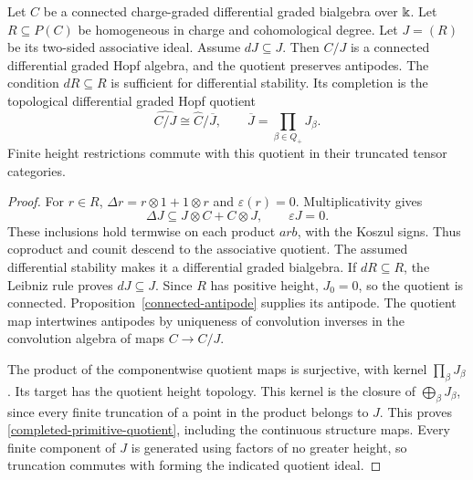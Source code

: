 \begin{theorem}
\label{primitive-quotient}
Let $C$ be a connected charge-graded differential graded bialgebra over
$\Bbbk$.  Let $R\subseteq P(C)$ be homogeneous in charge and cohomological
degree.  Let $J=(R)$ be its two-sided associative ideal.
Assume $dJ\subseteq J$.  Then $C/J$ is a connected differential graded
Hopf algebra, and the quotient preserves antipodes.
The condition $dR\subseteq R$ is sufficient for differential stability.
Its completion is the topological differential graded Hopf quotient
\begin{equation}
 \widehat{C/J}\cong\widehat C/\overline J,
 \qquad \overline J=\prod_{\beta\in Q_+}J_\beta.
 \label{completed-primitive-quotient}
\end{equation}
Finite height restrictions commute with this quotient in their
truncated tensor categories.
\end{theorem}

\begin{proof}
For $r\in R$, $\Delta r=r\otimes1+1\otimes r$ and
$\varepsilon(r)=0$.  Multiplicativity gives
\[
 \Delta J\subseteq J\otimes C+C\otimes J,
 \qquad \varepsilon J=0.
\]
These inclusions hold termwise on each product $arb$, with the Koszul
signs.  Thus coproduct and counit descend to the associative quotient.
The assumed differential stability makes it a differential graded
bialgebra.  If $dR\subseteq R$, the Leibniz rule proves $dJ\subseteq J$.
Since $R$ has positive height, $J_0=0$, so the quotient is connected.
Proposition~\ref{connected-antipode} supplies its antipode.
The quotient map intertwines antipodes by uniqueness of convolution
inverses in the convolution algebra of maps $C\to C/J$.

The product of the componentwise quotient maps is surjective, with
kernel $\prod_\beta J_\beta$.  Its target has the quotient height
topology.  This kernel is the closure of $\bigoplus_\beta J_\beta$,
since every finite truncation of a point in the product belongs to $J$.
This proves \eqref{completed-primitive-quotient}, including the
continuous structure maps.  Every finite component of $J$ is generated
using factors of no greater height, so truncation commutes with forming
the indicated quotient ideal.
\end{proof}

